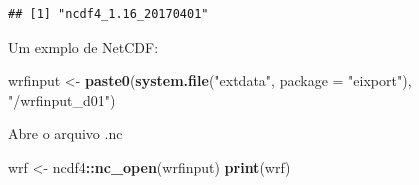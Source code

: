 \documentclass[]{book}
\newenvironment{Shaded}{\begin{snugshade}}{\end{snugshade}}
\newcommand{\KeywordTok}[1]{\textcolor[rgb]{0.13,0.29,0.53}{\textbf{#1}}}
\newcommand{\DataTypeTok}[1]{\textcolor[rgb]{0.13,0.29,0.53}{#1}}
\newcommand{\StringTok}[1]{\textcolor[rgb]{0.31,0.60,0.02}{#1}}
\newcommand{\OperatorTok}[1]{\textcolor[rgb]{0.81,0.36,0.00}{\textbf{#1}}}
\newcommand{\NormalTok}[1]{#1}
\theoremstyle{definition}
\theoremstyle{definition}
\theoremstyle{definition}
\theoremstyle{remark}
\begin{document}
\begin{verbatim}
## [1] "ncdf4_1.16_20170401"
\end{verbatim}

Um exmplo de NetCDF:

\begin{Shaded}
\begin{Highlighting}[]
\NormalTok{wrfinput <-}\StringTok{ }\KeywordTok{paste0}\NormalTok{(}\KeywordTok{system.file}\NormalTok{(}\StringTok{"extdata"}\NormalTok{, }\DataTypeTok{package =} \StringTok{"eixport"}\NormalTok{), }\StringTok{"/wrfinput_d01"}\NormalTok{)}
\end{Highlighting}
\end{Shaded}

Abre o arquivo .nc

\begin{Shaded}
\begin{Highlighting}[]
\NormalTok{wrf <-}\StringTok{ }\NormalTok{ncdf4}\OperatorTok{::}\KeywordTok{nc_open}\NormalTok{(wrfinput)}
\KeywordTok{print}\NormalTok{(wrf)}
\end{Highlighting}
\end{Shaded}
\end{document}
